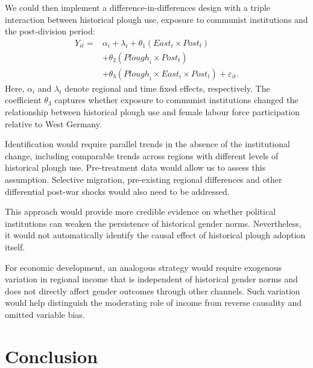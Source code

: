 \documentclass[12pt,a4paper]{article}
\begin{document}
We could then implement a difference-in-differences design with a triple interaction between historical plough use, exposure to communist institutions and the post-division period:
\begin{equation}
\begin{aligned}
    Y_{it} = {} & \alpha_i + \lambda_t
    + \theta_1 (\mathit{East}_i \times \mathit{Post}_t) \\
    & + \theta_2 (\mathit{Plough}_i \times \mathit{Post}_t) \\
    & + \theta_3 (\mathit{Plough}_i \times \mathit{East}_i \times \mathit{Post}_t)
    + \varepsilon_{it}.
\end{aligned}
\label{eq:ideal_strategy}
\end{equation}
Here, $\alpha_i$ and $\lambda_t$ denote regional and time fixed effects, respectively. The coefficient $\theta_3$ captures whether exposure to communist institutions changed the relationship between historical plough use and female labour force participation relative to West Germany.

Identification would require parallel trends in the absence of the institutional change, including comparable trends across regions with different levels of historical plough use. Pre-treatment data would allow us to assess this assumption. Selective migration, pre-existing regional differences and other differential post-war shocks would also need to be addressed.

This approach would provide more credible evidence on whether political institutions can weaken the persistence of historical gender norms. Nevertheless, it would not automatically identify the causal effect of historical plough adoption itself.

For economic development, an analogous strategy would require exogenous variation in regional income that is independent of historical gender norms and does not directly affect gender outcomes through other channels. Such variation would help distinguish the moderating role of income from reverse causality and omitted variable bias.


\section{Conclusion}
\end{document}

